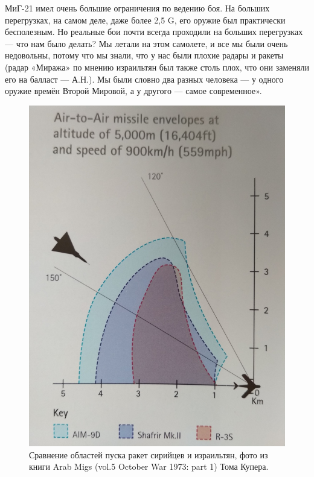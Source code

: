 МиГ-21 имел очень большие ограничения по ведению боя. На больших перегрузках, на самом деле, даже более 2,5 G, его оружие был практически бесполезным. Но реальные бои почти всегда проходили на больших перегрузках — что нам было делать? Мы летали на этом самолете, и все мы были очень недовольны, потому что мы знали, что у нас были плохие радары и ракеты (радар «Миража» по мнению израильтян был также столь плох, что они заменяли его на балласт — А.Н.). Мы были словно два разных человека — у одного оружие времён Второй Мировой, а у другого — самое современное». 


\begin{figure}[h!tb] 
	\centering\includegraphics[scale=0.4]{History_Tabett/7v_taieZfE0.jpg}
	\caption{Сравнение областей пуска ракет сирийцев и израильтян, фото из книги Arab Migs (vol.5 October War 1973: part 1) Тома Купера. }%
\end{figure}

